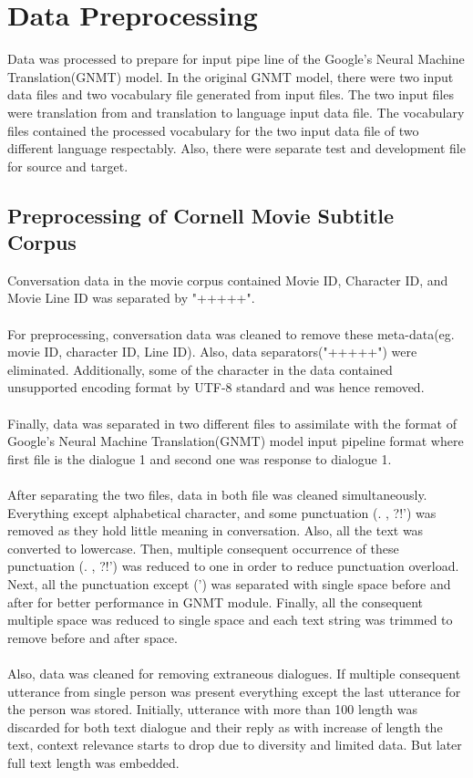 \documentclass[a4paper,12pt]{report}
\begin{document}
\section {Data Preprocessing}
Data was processed to prepare for input pipe line of the Google's Neural Machine Translation(GNMT) model. In the original GNMT model, there were two input data files and two vocabulary file generated from input files. The two input files were translation from and translation to language input data file. The vocabulary files contained the processed vocabulary for the two input data file of two different language respectably. Also, there were separate test and development file for source and target.
\subsection {Preprocessing of Cornell Movie Subtitle Corpus}
Conversation data in the movie corpus contained Movie ID, Character ID, and Movie Line ID was separated by "+++++".\\\\
For preprocessing, conversation data was cleaned to remove these meta-data(eg. movie ID, character ID, Line ID). Also, data separators("+++++") were eliminated. Additionally, some of the character in the data contained unsupported encoding format by UTF-8 standard and was hence removed.\\\\
Finally, data was separated in two different files to assimilate with the format of Google's Neural Machine Translation(GNMT) model input pipeline format where first file is the dialogue 1 and second one was response to dialogue 1.\\\\
After separating the two files, data in both file was cleaned simultaneously. Everything except alphabetical character, and some punctuation (. , ?!') was removed as they hold little meaning in conversation. Also, all the text was converted to lowercase. Then, multiple consequent occurrence of these punctuation (. , ?!') was reduced to one in order to reduce punctuation overload. Next, all the punctuation except (') was separated with single space before and after for better performance in GNMT module. Finally, all the consequent multiple space was reduced to single space and each text string was trimmed to remove before and after space.\\\\
Also, data was cleaned for removing extraneous dialogues. If multiple consequent utterance from single person was present everything except the last utterance for the person was stored. Initially, utterance with more than 100 length was discarded for both text dialogue and their reply as with increase of length the text, context relevance starts to drop due to diversity and limited data. But later full text length was embedded.\\\\
\end{document}
